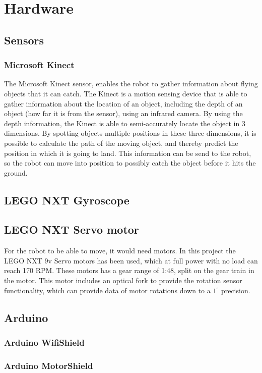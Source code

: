 \chapter{Hardware}
\label{chap:Hardware}

\section{Sensors}
\label{sec:Sensors}

\subsection{Microsoft Kinect}
\label{sec:Microsoft Kinect}
The Microsoft Kinect sensor, enables the robot to gather information about flying objects that it can catch. The Kinect is a motion sensing device that is able to gather information about the location of an object, including the depth of an object (how far it is from the sensor), using an infrared camera. By using the depth information, the Kinect is able to semi-accurately locate the object in 3 dimensions.
By spotting objects multiple positions in these three dimensions, it is possible to calculate the path of the moving object, and thereby predict the position in which it is going to land. This information can be send to the robot, so the robot can move into position to possibly catch the object before it hits the ground.


\section{LEGO NXT Gyroscope}
\label{sec:LEGO NXT Gyroscope}

\section{LEGO NXT Servo motor}
\label{sec:LEGO NXT Servo motor}
For the robot to be able to move, it would need motors. In this project the LEGO NXT 9v Servo motors has been used, which at full power with no load can reach 170 RPM. These motors has a gear range of 1:48, split on the gear train in the motor. This motor includes an optical fork to provide the rotation sensor functionality, which can provide data of motor rotations down to a \(1^{\circ}\) precision.

\section{Arduino}
\label{sec:Arduino}

\subsection{Arduino WifiShield}
\label{sec: Arduino WifiShield}

\subsection{Arduino MotorShield}
\label{sec:Arduino MotorShield}